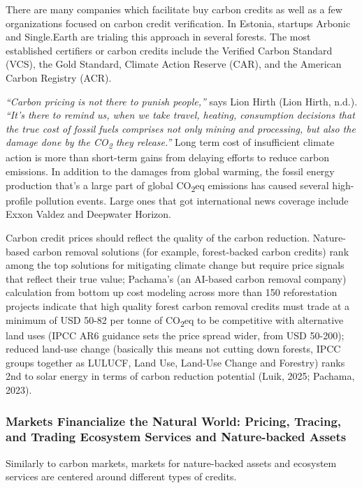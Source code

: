 \documentclass[
  12pt,
  letterpaper,
  DIV=11,
  numbers=noendperiod]{scrartcl}
\begin{document}
There are many companies which facilitate buy carbon credits as well as
a few organizations focused on carbon credit verification. In Estonia,
startups Arbonic and Single.Earth are trialing this approach in several
forests. The most established certifiers or carbon credits include the
Verified Carbon Standard (VCS), the Gold Standard, Climate Action
Reserve (CAR)‍, and the American Carbon Registry (ACR).

\emph{``Carbon pricing is not there to punish people,''} says Lion Hirth
(Lion Hirth, n.d.). \emph{``It's there to remind us, when we take
travel, heating, consumption decisions that the true cost of fossil
fuels comprises not only mining and processing, but also the damage done
by the CO\textsubscript{2} they release.''} Long term cost of
insufficient climate action is more than short-term gains from delaying
efforts to reduce carbon emissions. In addition to the damages from
global warming, the fossil energy production that's a large part of
global CO\textsubscript{2}eq emissions has caused several high-profile
pollution events. Large ones that got international news coverage
include Exxon Valdez and Deepwater Horizon.

Carbon credit prices should reflect the quality of the carbon reduction.
Nature-based carbon removal solutions (for example, forest-backed carbon
credits) rank among the top solutions for mitigating climate change but
require price signals that reflect their true value; Pachama's (an
AI-based carbon removal company) calculation from bottom up cost
modeling across more than 150 reforestation projects indicate that high
quality forest carbon removal credits must trade at a minimum of USD
50-82 per tonne of CO\textsubscript{2}eq to be competitive with
alternative land uses (IPCC AR6 guidance sets the price spread wider,
from USD 50-200); reduced land-use change (basically this means not
cutting down forests, IPCC groups together as LULUCF, Land Use, Land-Use
Change and Forestry) ranks 2nd to solar energy in terms of carbon
reduction potential (Luik, 2025; Pachama, 2023).

\subsubsection{Markets Financialize the Natural World: Pricing, Tracing,
and Trading Ecosystem Services and Nature-backed
Assets}\label{markets-financialize-the-natural-world-pricing-tracing-and-trading-ecosystem-services-and-nature-backed-assets}

Similarly to carbon markets, markets for nature-backed assets and
ecosystem services are centered around different types of credits.
\end{document}
